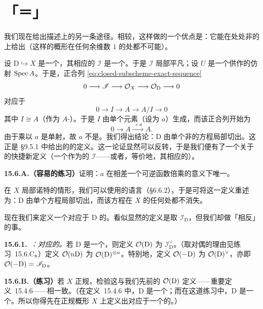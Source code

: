 
\section{\trEffectiveCartierDivisor{}「＝」\trInvertible\trIdealSheaf}

我们现在给出描述\trScheme{}上\trInvertibleSheaf{}的另一条途径。相较\trWeilDivisor，这样做的一个优点是：它能在处处非\trReduced{}的\trScheme{}上给出\trLineBundle（这样的概形在任何余维数 $1$ 的\trPrimeIdeal{}处都不可能\trRegular）。

设 $\mathrm{D}\hookrightarrow X$ 是一个\trClosedSubscheme，其相应的\trIdealSheaf{} $\mathscr{I}$ 是一个\trInvertibleSheaf。于是 $\mathscr{I}$ 局部平凡；设 $U$ 是一个供作\trTrivialization{}的仿射\trOpenSet{} $\operatorname{Spec} A$。于是，\trClosedSubscheme{}正合列 \eqref{eq:closed-subscheme-exact-sequence}
\[
0\longrightarrow\mathscr{I}\longrightarrow\mathcal{O}_X\longrightarrow\mathcal{O}_{\mathrm{D}}\longrightarrow 0
\]
对应于
\[
0\longrightarrow I\longrightarrow A\longrightarrow A/I\longrightarrow 0
\]
其中 $I\cong A$（作为 $A$-\trModule）。于是 $I$ 由单个元素（设为 $a$）生成，而该正合列开始为
\[
0\longrightarrow A\xrightarrow{\;\times a\;}A.
\]
由于乘以 $a$ 是单射，故 $a$ 不是\trZerodivisor。我们得出结论：$\mathrm{D}$ 由单个非\trZerodivisor{}的方程局部切出。这正是 \S9.5.1 中给出的\emph{\trEffectiveCartierDivisor}的定义。这一论证显然可以反转，于是我们便有了一个关于\trEffectiveCartierDivisor{}的快捷新定义（一个作为\trInvertibleSheaf{}的\trIdealSheaf{} $\mathscr{I}$——或者，等价地，其相应的\trClosedSubscheme）。

\textbf{15.6.A.（容易的练习）}\quad 证明：$a$ 在相差一个可逆函数倍乘的意义下唯一。

在 $X$ 局部诺特的情形，我们可以使用\trAssociatedPoint{}的语言（\S6.6.2），于是可将这一定义重述为：$\mathrm{D}$ 由单个方程局部切出，而该方程在 $X$ 的任何\trAssociatedPoint{}处都不消失。

现在我们来定义一个对应于 $\mathrm{D}$ 的\trInvertibleSheaf。看似显然的定义是取 $\mathscr{I}_{\mathrm{D}}$，但我们却做「相反」的事。

\textbf{15.6.1.}\ \emph{\trhDefinition{}：对应\trEffectiveCartierDivisor{}的\trInvertibleSheaf。}\quad 若 $\mathrm{D}$ 是一个\trEffectiveCartierDivisor，则定义\trInvertibleSheaf{} $\mathcal{O}(\mathrm{D})$ 为 $\mathscr{I}_{\mathrm{D}}^{\vee}$。（取对偶的理由见\mbox{练习~15.6.C}。）定义 $\mathcal{O}(n\mathrm{D})$ 为 $\mathcal{O}(\mathrm{D})^{\otimes n}$。特别地，定义 $\mathcal{O}(-\mathrm{D})$ 为 $\mathcal{O}(\mathrm{D})^{\vee}$，亦即 $\mathcal{O}(-\mathrm{D})=\mathscr{I}_{\mathrm{D}}$。

\textbf{15.6.B.（练习）}\quad 若 $X$ 正规，检验这与我们先前的 $\mathcal{O}(\mathrm{D})$ 定义——\mbox{重要定义~15.4.6}——相一致。（在\mbox{定义~15.4.6} 中，$\mathrm{D}$ 是一个\trWeilDivisor；而在这道练习中，$\mathrm{D}$ 是一个\trEffectiveCartierDivisor。所以你得先在正规\trNoetherian{}概形 $X$ 上定义出对应于一个\trEffectiveCartierDivisor{}的\trWeilDivisor。）

